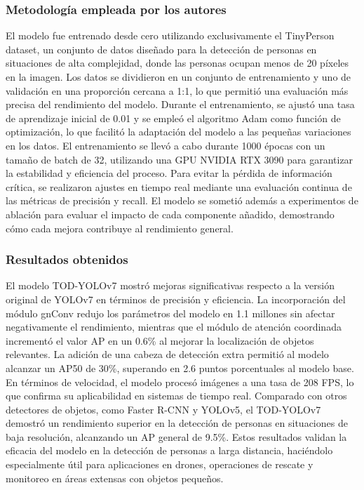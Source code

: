 \subsubsection{Metodología empleada por los autores}
El modelo fue entrenado desde cero utilizando exclusivamente el TinyPerson dataset, un conjunto de datos diseñado para la detección de personas en situaciones de alta complejidad, donde las personas ocupan menos de 20 píxeles en la imagen. Los datos se dividieron en un conjunto de entrenamiento y uno de validación en una proporción cercana a 1:1, lo que permitió una evaluación más precisa del rendimiento del modelo. Durante el entrenamiento, se ajustó una tasa de aprendizaje inicial de 0.01 y se empleó el algoritmo Adam como función de optimización, lo que facilitó la adaptación del modelo a las pequeñas variaciones en los datos. El entrenamiento se llevó a cabo durante 1000 épocas con un tamaño de batch de 32, utilizando una GPU NVIDIA RTX 3090 para garantizar la estabilidad y eficiencia del proceso. Para evitar la pérdida de información crítica, se realizaron ajustes en tiempo real mediante una evaluación continua de las métricas de precisión y recall. El modelo se sometió además a experimentos de ablación para evaluar el impacto de cada componente añadido, demostrando cómo cada mejora contribuye al rendimiento general.


\subsubsection{Resultados obtenidos}
El modelo TOD-YOLOv7 mostró mejoras significativas respecto a la versión original de YOLOv7 en términos de precisión y eficiencia. La incorporación del módulo gnConv redujo los parámetros del modelo en 1.1 millones sin afectar negativamente el rendimiento, mientras que el módulo de atención coordinada incrementó el valor AP en un 0.6\% al mejorar la localización de objetos relevantes. La adición de una cabeza de detección extra permitió al modelo alcanzar un AP50 de 30\%, superando en 2.6 puntos porcentuales al modelo base. En términos de velocidad, el modelo procesó imágenes a una tasa de 208 FPS, lo que confirma su aplicabilidad en sistemas de tiempo real. Comparado con otros detectores de objetos, como Faster R-CNN y YOLOv5, el TOD-YOLOv7 demostró un rendimiento superior en la detección de personas en situaciones de baja resolución, alcanzando un AP general de 9.5\%. Estos resultados validan la eficacia del modelo en la detección de personas a larga distancia, haciéndolo especialmente útil para aplicaciones en drones, operaciones de rescate y monitoreo en áreas extensas con objetos pequeños.


